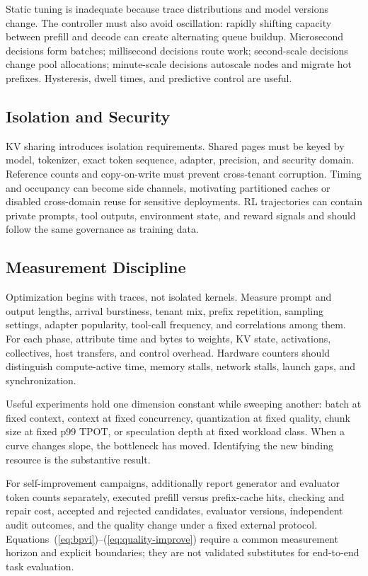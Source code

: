 \documentclass[journal]{IEEEtran}
\newcommand{\TPOT}{\ensuremath{\mathrm{TPOT}}}
\begin{document}
Static tuning is inadequate because trace distributions and model versions change. The controller must also avoid oscillation: rapidly shifting capacity between prefill and decode can create alternating queue buildup. Microsecond decisions form batches; millisecond decisions route work; second-scale decisions change pool allocations; minute-scale decisions autoscale nodes and migrate hot prefixes. Hysteresis, dwell times, and predictive control are useful.

\subsection{Isolation and Security}
KV sharing introduces isolation requirements. Shared pages must be keyed by model, tokenizer, exact token sequence, adapter, precision, and security domain. Reference counts and copy-on-write must prevent cross-tenant corruption. Timing and occupancy can become side channels, motivating partitioned caches or disabled cross-domain reuse for sensitive deployments. RL trajectories can contain private prompts, tool outputs, environment state, and reward signals and should follow the same governance as training data.

\subsection{Measurement Discipline}
Optimization begins with traces, not isolated kernels. Measure prompt and output lengths, arrival burstiness, tenant mix, prefix repetition, sampling settings, adapter popularity, tool-call frequency, and correlations among them. For each phase, attribute time and bytes to weights, KV state, activations, collectives, host transfers, and control overhead. Hardware counters should distinguish compute-active time, memory stalls, network stalls, launch gaps, and synchronization.

Useful experiments hold one dimension constant while sweeping another: batch at fixed context, context at fixed concurrency, quantization at fixed quality, chunk size at fixed p99 \TPOT, or speculation depth at fixed workload class. When a curve changes slope, the bottleneck has moved. Identifying the new binding resource is the substantive result.

For self-improvement campaigns, additionally report generator and evaluator token counts separately, executed prefill versus prefix-cache hits, checking and repair cost, accepted and rejected candidates, evaluator versions, independent audit outcomes, and the quality change under a fixed external protocol. Equations~(\ref{eq:bpvi})--(\ref{eq:quality-improve}) require a common measurement horizon and explicit boundaries; they are not validated substitutes for end-to-end task evaluation.
\end{document}
